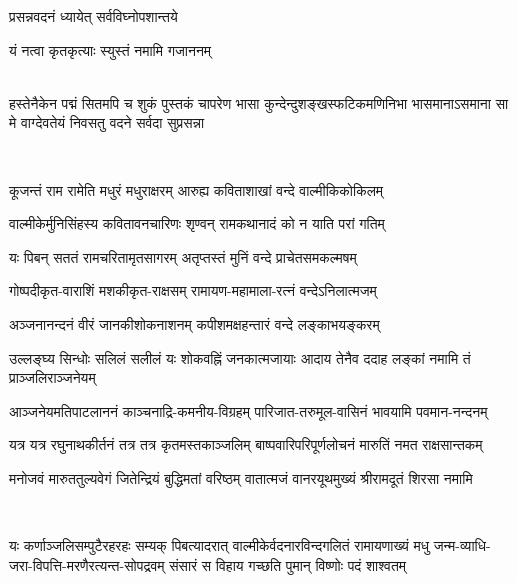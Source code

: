 

{प्रसन्नवदनं ध्यायेत् सर्वविघ्नोपशान्तये}

{यं नत्वा कृतकृत्याः स्युस्तं नमामि गजाननम्}

\mbox{}\\
{हस्तेनैकेन पद्मं सितमपि च शुकं पुस्तकं चापरेण}
{भासा कुन्देन्दुशङ्खस्फटिकमणिनिभा भासमानाऽसमाना}
{सा मे वाग्देवतेयं निवसतु वदने सर्वदा सुप्रसन्ना}

\mbox{}\\

\twolineshloka
{कूजन्तं राम रामेति मधुरं मधुराक्षरम्}
{आरुह्य कविताशाखां वन्दे वाल्मीकिकोकिलम्}

\twolineshloka
{वाल्मीकेर्मुनिसिंहस्य कवितावनचारिणः}
{शृण्वन् रामकथानादं को न याति परां गतिम्}

\twolineshloka
{यः पिबन् सततं रामचरितामृतसागरम्}
{अतृप्तस्तं मुनिं वन्दे प्राचेतसमकल्मषम्}

\begin{minipage}{\linewidth}
\centering
\resetShloka
{}

\twolineshloka
{गोष्पदीकृत-वाराशिं मशकीकृत-राक्षसम्}
{रामायण-महामाला-रत्नं वन्देऽनिलात्मजम्}
\end{minipage}

\twolineshloka
{अञ्जनानन्दनं वीरं जानकीशोकनाशनम्}
{कपीशमक्षहन्तारं वन्दे लङ्काभयङ्करम्}

\twolineshloka
{उल्लङ्घ्य सिन्धोः सलिलं सलीलं यः शोकवह्निं जनकात्मजायाः}
{आदाय तेनैव ददाह लङ्कां नमामि तं प्राञ्जलिराञ्जनेयम्}

\twolineshloka
{आञ्जनेयमतिपाटलाननं काञ्चनाद्रि-कमनीय-विग्रहम्}
{पारिजात-तरुमूल-वासिनं भावयामि पवमान-नन्दनम्}

\twolineshloka
{यत्र यत्र रघुनाथकीर्तनं तत्र तत्र कृतमस्तकाञ्जलिम्}
{बाष्पवारिपरिपूर्णलोचनं मारुतिं नमत राक्षसान्तकम्}

\twolineshloka
{मनोजवं मारुततुल्यवेगं जितेन्द्रियं बुद्धिमतां वरिष्ठम्}
{वातात्मजं वानरयूथमुख्यं श्रीरामदूतं शिरसा नमामि}

\mbox{}\\
\resetShloka
{}

\fourlineindentedshloka
{यः कर्णाञ्जलिसम्पुटैरहरहः सम्यक् पिबत्यादरात्}
{वाल्मीकेर्वदनारविन्दगलितं रामायणाख्यं मधु}
{जन्म-व्याधि-जरा-विपत्ति-मरणैरत्यन्त-सोपद्रवम्}
{संसारं स विहाय गच्छति पुमान् विष्णोः पदं शाश्वतम्}

